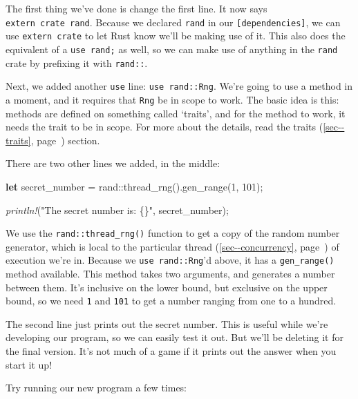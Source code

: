 \documentclass[a4paper,]{book}
\renewcommand*{\hyperref}[2][\ar]{%
  \def\ar{#2}%
  #2 (\autoref{#1}, page~\pageref{#1})}
\newenvironment{Shaded}{\begin{snugshade}}{\end{snugshade}}
\newcommand{\KeywordTok}[1]{\textcolor[rgb]{0.13,0.29,0.53}{\textbf{{#1}}}}
\newcommand{\DecValTok}[1]{\textcolor[rgb]{0.00,0.00,0.81}{{#1}}}
\newcommand{\StringTok}[1]{\textcolor[rgb]{0.31,0.60,0.02}{{#1}}}
\newcommand{\PreprocessorTok}[1]{\textcolor[rgb]{0.56,0.35,0.01}{\textit{{#1}}}}
\newcommand{\NormalTok}[1]{{#1}}
\begin{document}
The first thing we've done is change the first line. It now says
\texttt{extern\ crate\ rand}. Because we declared \texttt{rand} in our
\texttt{{[}dependencies{]}}, we can use \texttt{extern\ crate} to let
Rust know we'll be making use of it. This also does the equivalent of a
\texttt{use\ rand;} as well, so we can make use of anything in the
\texttt{rand} crate by prefixing it with \texttt{rand::}.

Next, we added another \texttt{use} line: \texttt{use\ rand::Rng}. We're
going to use a method in a moment, and it requires that \texttt{Rng} be
in scope to work. The basic idea is this: methods are defined on
something called `traits', and for the method to work, it needs the
trait to be in scope. For more about the details, read the
\hyperref[sec--traits]{traits} section.

There are two other lines we added, in the middle:

\begin{Shaded}
\begin{Highlighting}[]
    \KeywordTok{let} \NormalTok{secret_number = rand::thread_rng().gen_range(}\DecValTok{1}\NormalTok{, }\DecValTok{101}\NormalTok{);}

    \PreprocessorTok{println!}\NormalTok{(}\StringTok{"The secret number is: \{\}"}\NormalTok{, secret_number);}
\end{Highlighting}
\end{Shaded}

We use the \texttt{rand::thread\_rng()} function to get a copy of the
random number generator, which is local to the particular
\hyperref[sec--concurrency]{thread} of execution we're in. Because we
\texttt{use\ rand::Rng}'d above, it has a \texttt{gen\_range()} method
available. This method takes two arguments, and generates a number
between them. It's inclusive on the lower bound, but exclusive on the
upper bound, so we need \texttt{1} and \texttt{101} to get a number
ranging from one to a hundred.

The second line just prints out the secret number. This is useful while
we're developing our program, so we can easily test it out. But we'll be
deleting it for the final version. It's not much of a game if it prints
out the answer when you start it up!

Try running our new program a few times:
\end{document}
